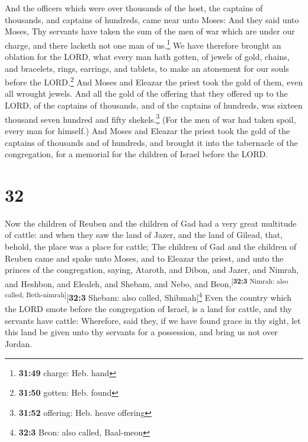  And the officers which were over thousands of the host,
the captains of thousands, and captains of hundreds, came near unto
Moses:  And they said unto Moses, Thy servants have taken
the sum of the men of war which are under our charge, and there lacketh
not one man of us.\footnote{\textbf{31:49} charge: Heb. hand}
 We have therefore brought an oblation for the LORD, what
every man hath gotten, of jewels of gold, chains, and bracelets, rings,
earrings, and tablets, to make an atonement for our souls before the
LORD.\footnote{\textbf{31:50} gotten: Heb. found}  And
Moses and Eleazar the priest took the gold of them, even all wrought
jewels.  And all the gold of the offering that they
offered up to the LORD, of the captains of thousands, and of the
captains of hundreds, was sixteen thousand seven hundred and fifty
shekels.\footnote{\textbf{31:52} offering: Heb. heave offering}
 (For the men of war had taken spoil, every man for
himself.)  And Moses and Eleazar the priest took the gold
of the captains of thousands and of hundreds, and brought it into the
tabernacle of the congregation, for a memorial for the children of
Israel before the LORD.

\hypertarget{section-31}{%
\section{32}\label{section-31}}

 Now the children of Reuben and the children of Gad had a
very great multitude of cattle: and when they saw the land of Jazer, and
the land of Gilead, that, behold, the place was a place for cattle;
 The children of Gad and the children of Reuben came and
spake unto Moses, and to Eleazar the priest, and unto the princes of the
congregation, saying,  Ataroth, and Dibon, and Jazer, and
Nimrah, and Heshbon, and Elealeh, and Shebam, and Nebo, and
Beon,\textsuperscript{{[}\textbf{32:3} Nimrah: also called,
Beth-nimrah{]}}{[}\textbf{32:3} Shebam: also called,
Shibmah{]}\footnote{\textbf{32:3} Beon: also called, Baal-meon}
 Even the country which the LORD smote before the
congregation of Israel, is a land for cattle, and thy servants have
cattle:  Wherefore, said they, if we have found grace in
thy sight, let this land be given unto thy servants for a possession,
and bring us not over Jordan.

